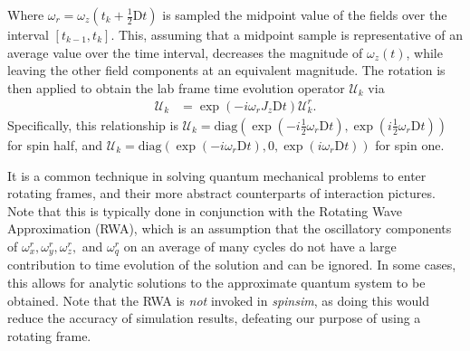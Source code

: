 \documentclass{jors}
\begin{document}
		Where \(\omega_r = \omega_z(t_k + \frac12\mathrm{D}t)\) is sampled the midpoint value of the fields over the interval \([t_{k - 1}, t_k]\).
		This, assuming that a midpoint sample is representative of an average value over the time interval, decreases the magnitude of \(\omega_z(t)\), while leaving the other field components at an equivalent magnitude.
		The rotation is then applied to obtain the lab frame time evolution operator \(\mathcal{U}_k\) via
		\begin{align}
			\mathcal{U}_k &= \exp(-i \omega_r J_z \mathrm{D}t) \mathcal{U}^r_k.
		\end{align}
		Specifically, this relationship is \(\mathcal{U}_k = \mathrm{diag}\left(\exp\left(-i \frac12 \omega_r \mathrm{D}t\right), \exp\left(i \frac12 \omega_r \mathrm{D}t\right)\right)\) for spin half, and \(\mathcal{U}_k = \mathrm{diag}(\exp(-i \omega_r \mathrm{D}t), 0, \exp(i \omega_r \mathrm{D}t))\) for spin one.

		It is a common technique in solving quantum mechanical problems to enter rotating frames, and their more abstract counterparts of interaction pictures\cite{j_j_sakurai_jun_john_modern_1994}.
		Note that this is typically done in conjunction with the Rotating Wave Approximation (RWA), which is an assumption that the oscillatory components of \(\omega^r_x, \omega^r_y, \omega^r_z,\) and \(\omega^r_q\) on an average of many cycles do not have a large contribution to time evolution of the solution and can be ignored.
		In some cases, this allows for analytic solutions to the approximate quantum system to be obtained.
		Note that the RWA is \emph{not} invoked in \emph{spinsim}, as doing this would reduce the accuracy of simulation results, defeating our purpose of using a rotating frame.
		
		
\end{document}

